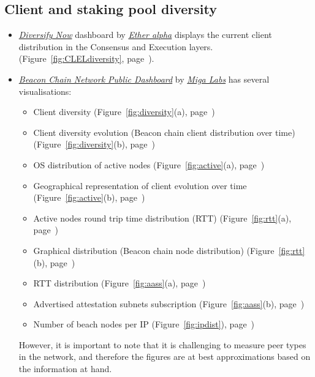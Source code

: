 \documentclass[UTF8]{article}
\begin{document}
{\subsection{Client and staking pool diversity}
\label{sec:diversity}
\begin{itemize}
	\item \textit{\href{https://clientdiversity.org/}{Diversify Now}} \cite{ea2023c} dashboard by \textit{\href{https://etheralpha.org/}{Ether alpha}} displays the current client distribution in the Consensus and Execution layers. (Figure~\ref{fig:CLELdiversity}, page~\pageref{fig:CLELdiversity}).
	\item \textit{\href{https://migalabs.es/beaconnodes}{Beacon Chain Network Public Dashboard}} by \textit{\href{https://migalabs.es/}{Miga Labs}} has several visualisations: 
	\begin{itemize}
		\item Client diversity  (Figure~\ref{fig:diversity}(a), page~\pageref{fig:diversity})
		\item Client diversity evolution (Beacon chain client distribution over time) (Figure~\ref{fig:diversity}(b), page~\pageref{fig:diversity})
		\item OS distribution of active nodes (Figure~\ref{fig:active}(a), page~\pageref{fig:active})
		\item Geographical representation of client evolution over time  (Figure~\ref{fig:active}(b), page~\pageref{fig:active})
		\item Active nodes round trip time distribution (RTT) (Figure~\ref{fig:rtt}(a), page~\pageref{fig:rtt})
		\item Graphical distribution (Beacon chain node distribution)  (Figure~\ref{fig:rtt}(b), page~\pageref{fig:rtt})
		\item RTT distribution (Figure~\ref{fig:aass}(a), page~\pageref{fig:aass})
		\item Advertised attestation subnets subscription (Figure~\ref{fig:aass}(b), page~\pageref{fig:aass})
		\item Number of beach nodes per IP (Figure~\ref{fig:ipdist}), page~\pageref{fig:ipdist})
	\end{itemize}
However, it is important to note that it is challenging to measure peer types in the network, and therefore the figures are at best approximations based on the information at hand. 

\end{itemize}	


}
\end{document}
